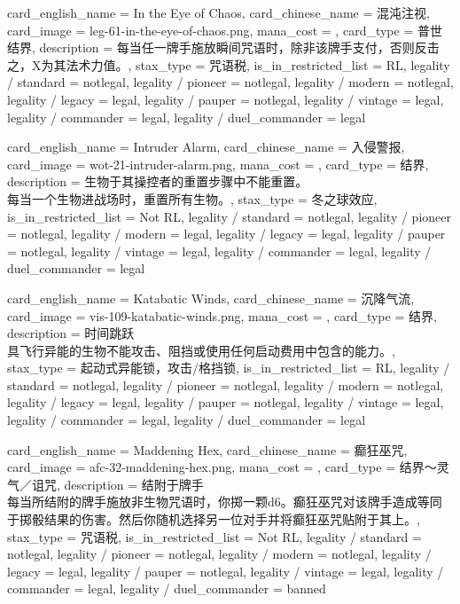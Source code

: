 \documentclass[lang = cn, color = black, 10pt]{AllThatStax}
\begin{document}
\card
{
	card_english_name = {In the Eye of Chaos},
	card_chinese_name = {混沌注视},
	card_image = leg-61-in-the-eye-of-chaos.png,
	mana_cost = ,
	card_type = 普世结界,
	description = {每当任一牌手施放瞬间咒语时，除非该牌手支付，否则反击之，X为其法术力值。},
	stax_type = 咒语税,
	is_in_restricted_list = RL,
	legality / standard = notlegal,
	legality / pioneer = notlegal,
	legality / modern = notlegal,
	legality / legacy = legal,
	legality / pauper = notlegal,
	legality / vintage = legal,
	legality / commander = legal,
	legality / duel_commander = legal
}

\card
{
	card_english_name = {Intruder Alarm},
	card_chinese_name = {入侵警报},
	card_image = wot-21-intruder-alarm.png,
	mana_cost = ,
	card_type = 结界,
	description = {生物于其操控者的重置步骤中不能重置。\\
每当一个生物进战场时，重置所有生物。},
	stax_type = 冬之球效应,
	is_in_restricted_list = Not RL,
	legality / standard = notlegal,
	legality / pioneer = notlegal,
	legality / modern = legal,
	legality / legacy = legal,
	legality / pauper = notlegal,
	legality / vintage = legal,
	legality / commander = legal,
	legality / duel_commander = legal
}

\card
{
	card_english_name = {Katabatic Winds},
	card_chinese_name = {沉降气流},
	card_image = vis-109-katabatic-winds.png,
	mana_cost = ,
	card_type = 结界,
	description = {时间跳跃\\
具飞行异能的生物不能攻击、阻挡或使用任何启动费用中包含的能力。},
	stax_type = 起动式异能锁，攻击/格挡锁,
	is_in_restricted_list = RL,
	legality / standard = notlegal,
	legality / pioneer = notlegal,
	legality / modern = notlegal,
	legality / legacy = legal,
	legality / pauper = notlegal,
	legality / vintage = legal,
	legality / commander = legal,
	legality / duel_commander = legal
}

\card
{
	card_english_name = {Maddening Hex},
	card_chinese_name = {癫狂巫咒},
	card_image = afc-32-maddening-hex.png,
	mana_cost = ,
	card_type = 结界～灵气／诅咒,
	description = {结附于牌手\\
每当所结附的牌手施放非生物咒语时，你掷一颗d6。癫狂巫咒对该牌手造成等同于掷骰结果的伤害。然后你随机选择另一位对手并将癫狂巫咒贴附于其上。},
	stax_type = 咒语税,
	is_in_restricted_list = Not RL,
	legality / standard = notlegal,
	legality / pioneer = notlegal,
	legality / modern = notlegal,
	legality / legacy = legal,
	legality / pauper = notlegal,
	legality / vintage = legal,
	legality / commander = legal,
	legality / duel_commander = banned
}
\end{document}
